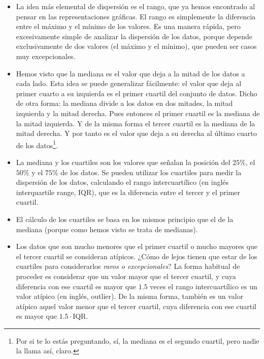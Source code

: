 \begin{itemize}

    \item La idea más elemental de dispersión es el {\sf rango}, que ya hemos encontrado al pensar en las representaciones gráficas. El rango es simplemente la diferencia entre el máximo y el mínimo de los valores. Es una manera rápida, pero excesivamente simple de analizar la dispersión de los datos, porque depende exclusivamente de dos valores (el máximo y el mínimo), que pueden ser casos muy excepcionales.

    \item Hemos visto que la mediana es el valor que deja a la mitad de los datos a cada lado. Esta idea se puede generalizar fácilmente: el valor que deja al primer cuarto a su izquierda es el {\sf primer cuartil} del conjunto de datos. Dicho de otra forma: la mediana divide a los datos en dos mitades, la mitad izquierda y la mitad derecha. Pues entonces el primer cuartil es la mediana de la mitad izquierda. Y de la misma forma el {\sf tercer cuartil} es la mediana de la mitad derecha. Y por tanto es el valor que deja a su derecha al último cuarto de los datos\footnote{ Por si te lo estás preguntando, sí, la mediana es el segundo cuartil, pero nadie la llama así, claro.}.

    \item La mediana y los cuartiles son los valores que señalan la posición del $25\%$, el $50\%$ y el $75\%$ de los datos. Se pueden utilizar los cuartiles  para medir la dispersión de los datos, calculando el {\sf rango intercuartílico} (en inglés interquartile range, IQR), que es la diferencia entre el tercer y el primer cuartil.

    \item El {\sf cálculo de los cuartiles} se basa en los mismos principio que el de la mediana (porque como hemos visto se trata de medianas).

    \item Los datos que son mucho menores que el primer cuartil o mucho mayores que el tercer cuartil se consideran atípicos. ¿Cómo de lejos tienen que estar de los cuartiles para considerarlos {\em raros o excepcionales}? La forma habitual de proceder es considerar que {\sf un valor mayor que el tercer cuartil, y cuya diferencia con ese cuartil es mayor que $1.5$ veces el rango intercuartílico es un valor atípico} (en inglés, outlier).  De la misma forma, también es un valor atípico aquel valor menor que el tercer cuartil, cuya diferencia con ese cuartil es mayor que $1.5\cdot$IQR.


\end{itemize}
